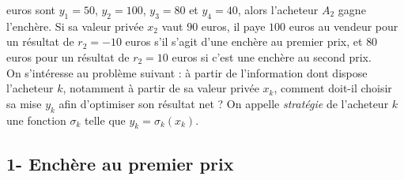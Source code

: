 \documentclass[11pt]{article}%
\begin{document}
euros sont $y_1=50$, $y_2=100$, $y_3=80$ et $y_4=40$, alors l'acheteur 
$A_2$ gagne l'enchère. Si sa valeur privée $x_2$ vaut $90$ euros, il 
paye $100$ euros au vendeur pour un résultat de $r_2=-10$ euros s'il 
s'agit d'une enchère au premier prix, et $80$ euros pour un résultat de 
$r_2=10$ euros si c'est une enchère au second prix.\\
On s'intéresse au problème suivant : à partir de l'information dont 
dispose l'acheteur $k$, notamment à partir de sa valeur privée $x_k$, 
comment doit-il choisir sa mise $y_k$ afin d'optimiser son résultat net 
? On appelle \emph{stratégie} de l'acheteur $k$ une fonction $\sigma_k$ 
telle que $y_k = \sigma_k(x_k)$.



\subsection*{1- Enchère au premier prix}
\end{document}
